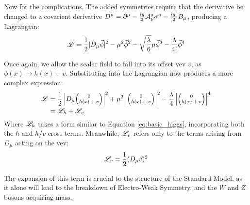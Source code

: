         Now for the complications.
        The added symmetries require that the derivative be changed to a covarient derivative 
            $D^{\mu} = \partial^{\mu} - \frac{ig}{2} \mathcal{A}^a_{\mu} \sigma^a - \frac{ig'}{2} B_{\mu}$,
            producing a Lagrangian:
        \begin{equation} \begin{split}
            \mathscr{L} & = \frac{1}{2} |D_{\mu} \vec{\phi}|^2
                - \mu^2 \vec{\phi}^2
                -\sqrt{\frac{\lambda}{6}} \mu \vec{\phi}^3
                - \frac{\lambda}{4!} \vec{\phi}^4 \\
        \end{split} \end{equation}

        Once again, we allow the scalar field to fall into its offset vev $v$, as $\phi(x) \rightarrow h(x) + v$.
        Substituting into the Lagrangian now produces a more complex expression:
        \begin{equation} \begin{split}
            \label{eq:fullHiggs}
            \Lag & = \frac{1}{2} \left|D_{\mu} \minimatrix{0\\h(x)+v}\right|^2
                + \mu^2 \left|\minimatrix{0\\h(x)+v}\right|^2
                - \frac{\lambda}{4} \left|\minimatrix{0\\h(x)+v}\right|^4 \\
             & = \Lag_h + \Lag_v
        \end{split} \end{equation}
        Where $\mathscr{L}_h$ takes a form similar to Equation \ref{eq:basic_higgs}, incorporating both the $h$ and $h$/$v$ cross terms.
        Meanwhile, $\mathscr{L}_v$ refers only to the terms arising from $D_{\mu}$ acting on the vev:
        \begin{equation}
            \label{eq:lagV}
            \mathscr{L}_v = \frac{1}{2} (D_{\mu} \vec{v})^2
        \end{equation}

        The expansion of this term is crucial to the structure of the Standard Model,
            as it alone will lead to the breakdown of Electro-Weak Symmetry,
            and the $W$ and $Z$ bosons acquiring mass.

